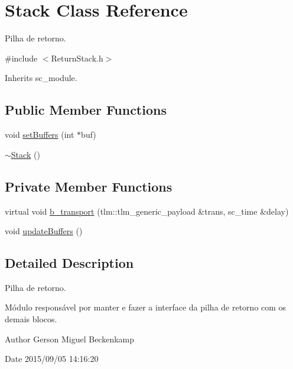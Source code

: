 \hypertarget{classStack}{\section{Stack Class Reference}
\label{classStack}
}


Pilha de retorno.  




{\ttfamily \#include $<$Return\+Stack.\+h$>$}



Inherits sc\+\_\+module.

\subsection*{Public Member Functions}
\begin{DoxyCompactItemize}
\item 
void \hyperlink{classStack_a9307cd8107283c08c080b22bdd66d196}{set\+Buffers} (int $\ast$buf)
\item 
\hyperlink{classStack_a40bd5dff912f0e5290777c4b46d17809}{$\sim$\+Stack} ()
\end{DoxyCompactItemize}
\subsection*{Private Member Functions}
\begin{DoxyCompactItemize}
\item 
virtual void \hyperlink{classStack_a188c0ef6d86bb6100b6c1a63e821bd7f}{b\+\_\+transport} (tlm\+::tlm\+\_\+generic\+\_\+payload \&trans, sc\+\_\+time \&delay)
\item 
void \hyperlink{classStack_a5c98f94f6a3a5384c754794b1aebb724}{update\+Buffers} ()
\end{DoxyCompactItemize}


\subsection{Detailed Description}
Pilha de retorno. 

Módulo responsável por manter e fazer a interface da pilha de retorno com os demais blocos.

\begin{DoxyAuthor}{Author}
Gerson Miguel Beckenkamp 
\end{DoxyAuthor}
\begin{DoxyDate}{Date}
2015/09/05 14\+:16\+:20 
\end{DoxyDate}


